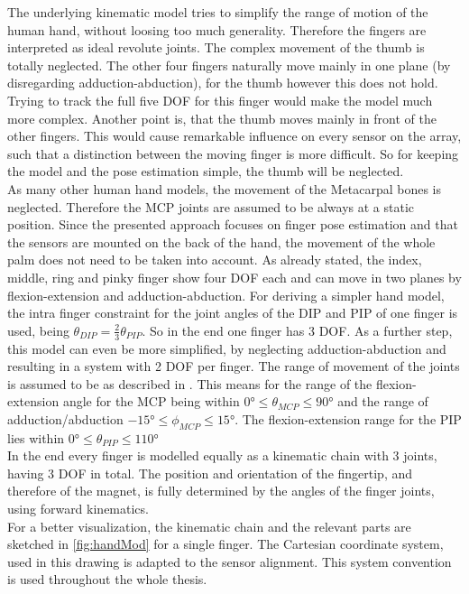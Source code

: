 The underlying kinematic model tries to simplify the range of motion of the human hand, without loosing too much generality. Therefore the fingers are interpreted as ideal revolute joints. The complex movement of the thumb is totally neglected. The other four fingers naturally move mainly in one plane (by disregarding adduction-abduction), for the thumb however this does not hold. Trying to track the full five \ac{DOF} for this finger would make the model much more complex. Another point is, that the thumb moves mainly \grqq in front \grqq of the other fingers. This would cause remarkable influence on every sensor on the array, such that a distinction between the moving finger is more difficult. So for keeping the model and the pose estimation simple, the thumb will be neglected.\\
As many other human hand models, the movement of the Metacarpal bones is neglected. Therefore the \ac{MCP} joints are assumed to be always at a static position. Since the presented approach focuses on finger pose estimation and that the sensors are mounted on the back of the hand, the movement of the whole palm does not need to be taken into account. As already stated, the index, middle, ring and pinky finger show four \ac{DOF} each and can move in two planes by flexion-extension and adduction-abduction. For deriving a simpler hand model, the intra finger constraint for the joint angles of the \ac{DIP} and \ac{PIP} of one finger is used, being $ \theta_{DIP} = \frac{2}{3} \theta_{PIP} $. So in the end one finger has 3 \ac{DOF}. As a further step, this model can even be more simplified, by neglecting adduction-abduction and resulting in a system with 2 \ac{DOF} per finger. The range of movement of the joints is assumed to be as described in \cite{lin2000modeling}. This means for the range of the flexion-extension angle for the \ac{MCP} being within $ \ang{0} \leq \theta_{MCP} \leq \ang{90} $ and the range of adduction/abduction $ \ang{-15} \leq \phi_{MCP} \leq \ang{+15} $. The flexion-extension range for the \ac{PIP} lies within $ \ang{0} \leq \theta_{PIP} \leq \ang{110} $\\
In the end every finger is modelled equally as a kinematic chain with 3 joints, having 3 \ac{DOF} in total. The position and orientation of the fingertip, and therefore of the magnet, is fully determined by the angles of the finger joints, using forward kinematics.\\
For a better visualization, the kinematic chain and the relevant parts are sketched in \ref{fig:handMod} for a single finger. The Cartesian coordinate system, used in this drawing is adapted to the sensor alignment. This system convention is used throughout the whole thesis.
